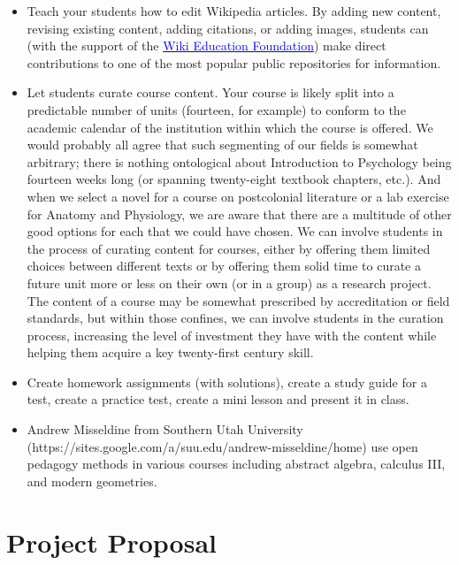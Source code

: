 \documentclass[11pt]{article}
\newcommand{\alink}[2]{\href{#1}{\textcolor{blue}{#2}}}
\begin{document}
\begin{itemize}
  \item Teach your students how to edit Wikipedia articles. By adding new content, revising existing content, adding citations, or adding images, students can (with the support of the \alink{https://wikiedu.org/teach-with-wikipedia/}{Wiki Education Foundation}) make direct contributions to one of the most popular public repositories for information.
  \item Let students curate course content. Your course is likely split into a predictable number of units (fourteen, for example) to conform to the academic calendar of the institution within which the course is offered. We would probably all agree that such segmenting of our fields is somewhat arbitrary; there is nothing ontological about Introduction to Psychology being fourteen weeks long (or spanning twenty-eight textbook chapters, etc.). And when we select a novel for a course on postcolonial literature or a lab exercise for Anatomy and Physiology, we are aware that there are a multitude of other good options for each that we could have chosen. We can involve students in the process of curating content for courses, either by offering them limited choices between different texts or by offering them solid time to curate a future unit more or less on their own (or in a group) as a research project. The content of a course may be somewhat prescribed by accreditation or field standards, but within those confines, we can involve students in the curation process, increasing the level of investment they have with the content while helping them acquire a key twenty-first century skill.
  \item Create homework assignments (with solutions), create a study guide for a test, create a practice test, create a mini lesson and present it in class.
  \item Andrew Misseldine from Southern Utah University (https://sites.google.com/a/suu.edu/andrew-misseldine/home) use open pedagogy methods in various courses including abstract algebra, calculus III, and modern geometries.
\end{itemize}

\section{Project Proposal}
\end{document}
